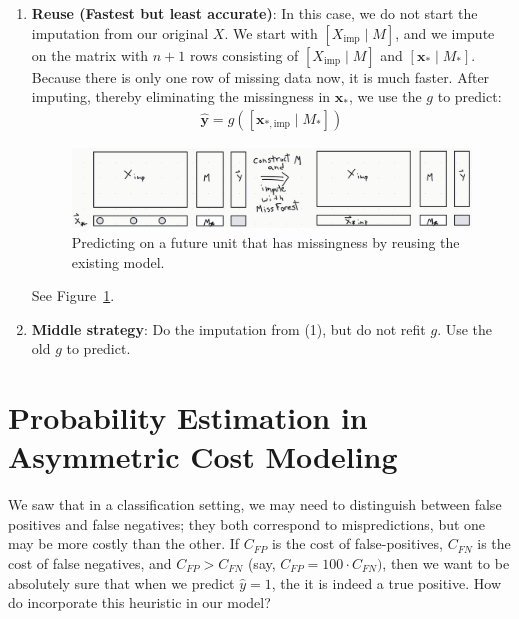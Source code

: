 \documentclass[12pt, a4paper]{article}
\theoremstyle{definition}
\begin{document}
\begin{enumerate}[label=(\textbf{\arabic*})]
		\item \textbf{Reuse (Fastest but least accurate)}: In this case, we
		do not start the imputation from our original $X$. We start with
		$[X_{\text{imp}} \mid M]$, and we impute on the matrix with $n+1$ rows
		consisting of $[X_{\text{imp}} \mid M]$ and $[\bm{x}_* \mid M_*]$.
		Because there is only one row of missing data now, it is much faster.
		After imputing, thereby eliminating the missingness in $\bm{x}_*$,
		we use the  $g$ to predict:
		\begin{align*}
			\hat{\bm{y}} = g([\bm{x}_{*, \text{imp}} \mid M_*])
		\end{align*}
		\begin{figure}
			\centering
			\includegraphics[width=1.0\textwidth]{predicting-future-unit-with-missingness-reuse}
			\caption{Predicting on a future unit that has missingness by reusing the existing model.}
			\label{fig:predicting-future-by-reuse}
		\end{figure}
		See Figure~\ref{fig:predicting-future-by-reuse}.
		
		\item \textbf{Middle strategy}: Do the imputation from (1), but do not
		refit $g$. Use the old $g$ to predict.
	\end{enumerate}
	\section{Probability Estimation in Asymmetric Cost Modeling}
	We saw that in a classification setting, we may need to distinguish between
	false positives and false negatives; they both correspond to mispredictions,
	but one may be more costly than the other. If $C_{FP}$ is the cost of
	false-positives, $C_{FN}$ is the cost of false negatives, and
	$C_{FP} > C_{FN}$ (say, $C_{FP}= 100 \cdot C_{FN})$, then we want to be
	absolutely sure that when we predict $\hat{y} = 1$, the it is indeed
	a true positive. How do incorporate this heuristic in our model?
	
\end{document}
